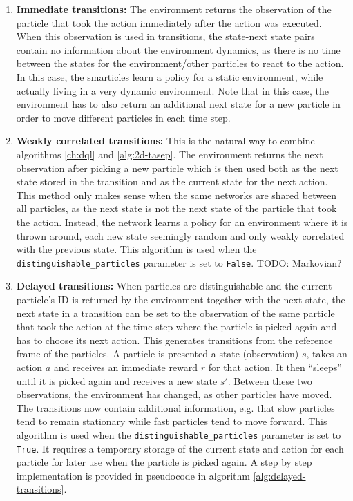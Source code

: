 \begin{enumerate}
    \item \textbf{Immediate transitions:} The environment returns the observation of the particle that took the action immediately after the action was executed. When this observation is used in transitions, the state-next state pairs contain no information about the environment dynamics, as there is no time between the states for the environment/other particles to react to the action. In this case, the smarticles learn a policy for a static environment, while actually living in a very dynamic environment. Note that in this case, the environment has to also return an additional next state for a new particle in order to move different particles in each time step.
    \item \textbf{Weakly correlated transitions:} This is the natural way to combine algorithms \ref{ch:dql} and \ref{alg:2d-tasep}. The environment returns the next observation after picking a new particle which is then used both as the next state stored in the transition and as the current state for the next action. This method only makes sense when the same networks are shared between all particles, as the next state is not the next state of the particle that took the action. Instead, the network learns a policy for an environment where it is thrown around, each new state seemingly random and only weakly correlated with the previous state. This algorithm is used when the \texttt{distinguishable\_particles} parameter is set to \texttt{False}. TODO: Markovian?
    \item \textbf{Delayed transitions:} When particles are distinguishable and the current particle's ID is returned by the environment together with the next state, the next state in a transition can be set to the observation of the same particle that took the action at the time step where the particle is picked again and has to choose its next action. This generates transitions from the reference frame of the particles. A particle is presented a state (observation) $s$, takes an action $a$ and receives an immediate reward $r$ for that action. It then \enquote{sleeps} until it is picked again and receives a new state $s'$. Between these two observations, the environment has changed, as other particles have moved. The transitions now contain additional information, e.g. that slow particles tend to remain stationary while fast particles tend to move forward. This algorithm is used when the \texttt{distinguishable\_particles} parameter is set to \texttt{True}. It requires a temporary storage of the current state and action for each particle for later use when the particle is picked again. A step by step implementation is provided in pseudocode in algorithm \ref{alg:delayed-transitions}.
\end{enumerate}

